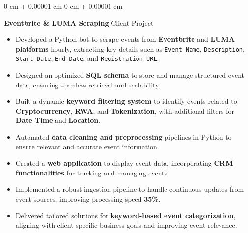\documentclass[10pt, letterpaper]{article}
\newenvironment{highlights}{
    \begin{itemize}[
        topsep=0.10 cm,
        parsep=0.10 cm,
        partopsep=0pt,
        itemsep=0pt,
        leftmargin=0 cm + 10pt
    ]
}{
    \end{itemize}
} %
\newenvironment{onecolentry}{
    \begin{adjustwidth}{
        0 cm + 0.00001 cm
    }{
        0 cm + 0.00001 cm
    }
}{
    \end{adjustwidth}
} %
\begin{document}
\begin{onecolentry}
	\textbf{Eventbrite \& LUMA Scraping} \hfill Client Project
	\begin{highlights}
		\item Developed a Python bot to scrape events from \textbf{Eventbrite} and \textbf{LUMA platforms} hourly, extracting key details such as \texttt{Event Name}, \texttt{Description}, \texttt{Start Date}, \texttt{End Date}, and \texttt{Registration URL}.
		\item Designed an optimized \textbf{SQL schema} to store and manage structured event data, ensuring seamless retrieval and scalability.
		\item Built a dynamic \textbf{keyword filtering system} to identify events related to \textbf{Cryptocurrency}, \textbf{RWA}, and \textbf{Tokenization}, with additional filters for \textbf{Date Time} and \textbf{Location}.
		\item Automated \textbf{data cleaning and preprocessing} pipelines in Python to ensure relevant and accurate event information.
		\item Created a \textbf{web application} to display event data, incorporating \textbf{CRM functionalities} for tracking and managing events.
		\item Implemented a robust ingestion pipeline to handle continuous updates from event sources, improving processing speed \textbf{35\%}.
		\item Delivered tailored solutions for \textbf{keyword-based event categorization}, aligning with client-specific business goals and improving event relevance.
	\end{highlights}
\end{onecolentry}

\vspace{0.15 cm}
\end{document}
